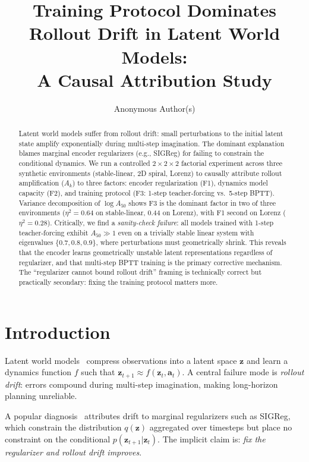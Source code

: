 \documentclass{article}
\title{Training Protocol Dominates Rollout Drift in Latent World Models:\\
A Causal Attribution Study}
\author{%
  Anonymous Author(s)
}
\begin{document}
\maketitle

\begin{abstract}
Latent world models suffer from rollout drift: small perturbations to the initial latent state
amplify exponentially during multi-step imagination. The dominant explanation blames marginal
encoder regularizers (e.g., SIGReg) for failing to constrain the conditional dynamics.
We run a controlled $2{\times}2{\times}2$ factorial experiment across three synthetic environments
(stable-linear, 2D spiral, Lorenz) to causally attribute rollout amplification ($A_k$) to
three factors: encoder regularization (F1), dynamics model capacity (F2), and training protocol
(F3: 1-step teacher-forcing vs.\ 5-step BPTT).
Variance decomposition of $\log A_{50}$ shows F3 is the dominant factor in two of three
environments ($\eta^2 = 0.64$ on stable-linear, $0.44$ on Lorenz), with F1 second on Lorenz
($\eta^2 = 0.28$).
Critically, we find a \emph{sanity-check failure}: all models trained with 1-step teacher-forcing
exhibit $A_{50} \gg 1$ even on a trivially stable linear system with eigenvalues $\{0.7, 0.8, 0.9\}$,
where perturbations must geometrically shrink.
This reveals that the encoder learns geometrically unstable latent representations regardless of
regularizer, and that multi-step BPTT training is the primary corrective mechanism.
The ``regularizer cannot bound rollout drift'' framing is technically correct but practically
secondary: fixing the training protocol matters more.
\end{abstract}

\section{Introduction}

Latent world models~\citep{hafner2023dreamerv3,lecun2022jepa} compress observations into a latent
space $\mathbf{z}$ and learn a dynamics function $f$ such that $\mathbf{z}_{t+1} \approx f(\mathbf{z}_t, \mathbf{a}_t)$.
A central failure mode is \emph{rollout drift}: errors compound during multi-step imagination,
making long-horizon planning unreliable.

A popular diagnosis~\citep{jepa2025lewm} attributes drift to marginal regularizers such as SIGReg,
which constrain the distribution $q(\mathbf{z})$ aggregated over timesteps but place no constraint on
the conditional $p(\mathbf{z}_{t+1} | \mathbf{z}_t)$.
The implicit claim is: \emph{fix the regularizer and rollout drift improves}.
\end{document}
